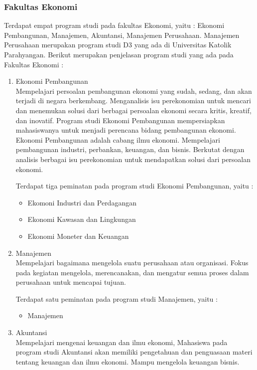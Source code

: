 \subsubsection{Fakultas Ekonomi}
Terdapat empat program studi pada fakultas Ekonomi, yaitu : Ekonomi Pembangunan, Manajemen, Akuntansi, Manajemen Perusahaan. Manajemen Perusahaan merupakan program studi D3 yang ada di Universitas Katolik Parahyangan. Berikut merupakan penjelasan program studi yang ada pada Fakultas Ekonomi :
	
	\begin{enumerate}
		\item Ekonomi Pembangunan\\
			 Mempelajari persoalan pembangunan ekonomi yang sudah, sedang, dan akan
terjadi di negara berkembang. Menganalisis isu perekonomian untuk mencari dan menemukan solusi dari berbagai persoalan ekonomi secara kritis, kreatif, dan inovatif. Program studi Ekonomi Pembangunan mempersiapkan mahasiswanya untuk menjadi perencana bidang pembangunan ekonomi. Ekonomi Pembangunan adalah cabang ilmu ekonomi. Mempelajari pembangunan industri, perbankan, keuangan, dan bisnis. Berkutat dengan analisis berbagai isu perekonomian untuk mendapatkan solusi dari persoalan ekonomi.

			Terdapat tiga peminatan pada program studi Ekonomi Pembangunan, yaitu :
			\begin{itemize}
				\item Ekomoni Industri dan Perdagangan
				\item Ekonomi Kawasan dan Lingkungan
				\item Ekonomi Moneter dan Keuangan
			\end{itemize}\leavevmode

		\item Manajemen\\
			Mempelajari bagaimana mengelola suatu perusahaan atau organisasi. Fokus pada kegiatan mengelola, merencanakan, dan mengatur semua proses dalam perusahaan untuk mencapai tujuan.
			
			Terdapat satu peminatan pada program studi Manajemen, yaitu :
			\begin{itemize}
				\item Manajemen
			\end{itemize}\leavevmode

		\item Akuntansi\\
			Mempelajari mengenai keuangan dan ilmu ekonomi, Mahasiswa pada program studi Akuntansi akan memiliki pengetahuan dan penguasaan materi tentang keuangan dan ilmu ekonomi. Mampu mengelola keuangan bisnis.
			

\end{enumerate}
